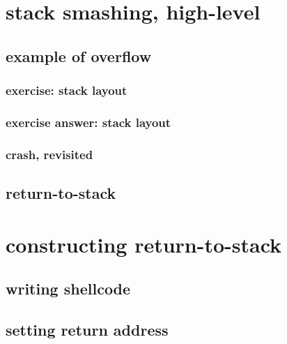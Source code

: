 
\section{stack smashing, high-level}


\subsection{example of overflow}


\subsubsection{exercise: stack layout}


\subsubsection{exercise answer: stack layout}


\subsubsection{crash, revisited}


\subsection{return-to-stack}


\section{constructing return-to-stack}


\subsection{writing shellcode}




\subsection{setting return address}


